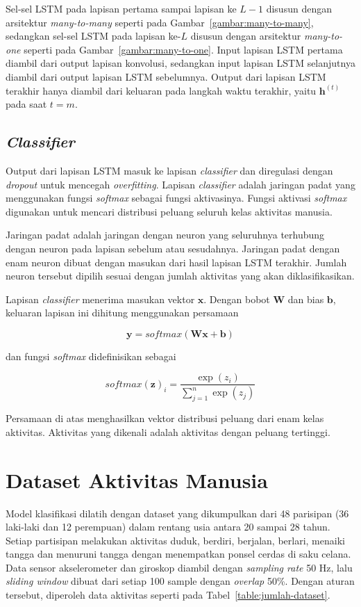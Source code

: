Sel-sel LSTM pada lapisan pertama sampai lapisan ke $L-1$ disusun dengan arsitektur \textit{many-to-many} seperti pada Gambar~\ref{gambar:many-to-many}, sedangkan sel-sel LSTM pada lapisan ke-$L$ disusun dengan arsitektur \textit{many-to-one} seperti pada Gambar~\ref{gambar:many-to-one}. Input lapisan LSTM pertama diambil dari output lapisan konvolusi, sedangkan input lapisan LSTM selanjutnya diambil dari output lapisan LSTM sebelumnya. Output dari lapisan LSTM terakhir hanya diambil dari keluaran pada langkah waktu terakhir, yaitu $\pmb{h}^{(t)}$ pada saat $t = m$.

\subsection{\textit{Classifier}}
Output dari lapisan LSTM masuk ke lapisan \textit{classifier} dan diregulasi dengan \textit{dropout} untuk mencegah \textit{overfitting}. Lapisan \textit{classifier} adalah jaringan padat yang menggunakan fungsi \textit{softmax} sebagai fungsi aktivasinya. Fungsi aktivasi \textit{softmax} digunakan untuk mencari distribusi peluang seluruh kelas aktivitas manusia.

Jaringan padat adalah jaringan dengan neuron yang seluruhnya terhubung dengan neuron pada lapisan sebelum atau sesudahnya. Jaringan padat dengan enam neuron dibuat dengan masukan dari hasil lapisan LSTM terakhir. Jumlah neuron tersebut dipilih sesuai dengan jumlah aktivitas yang akan diklasifikasikan.

Lapisan \textit{classifier} menerima masukan vektor $\pmb{x}$. Dengan bobot $\pmb{W}$ dan bias $\pmb{b}$, keluaran lapisan ini dihitung menggunakan persamaan

\begin{equation}
    \pmb{y} = softmax(\pmb{W} \pmb{x} + \pmb{b})
\end{equation}

\noindent
dan fungsi \textit{softmax} didefinisikan sebagai

\begin{equation}
    softmax(\pmb{z})_i = \frac{\exp(z_i)}{\sum_{j=1}^n \exp(z_j)}
\end{equation}

Persamaan di atas menghasilkan vektor distribusi peluang dari enam kelas aktivitas. Aktivitas yang dikenali adalah aktivitas dengan peluang tertinggi.

\section{Dataset Aktivitas Manusia}
Model klasifikasi dilatih dengan dataset yang dikumpulkan dari 48 parisipan (36 laki-laki dan 12 perempuan) dalam rentang usia antara 20 sampai 28 tahun. Setiap partisipan melakukan aktivitas duduk, berdiri, berjalan, berlari, menaiki tangga dan menuruni tangga dengan menempatkan ponsel cerdas di saku celana. Data sensor akselerometer dan giroskop diambil dengan \textit{sampling rate} 50 Hz, lalu \textit{sliding window} dibuat dari setiap 100 sample dengan \textit{overlap} 50\%. Dengan aturan tersebut, diperoleh data aktivitas seperti pada Tabel~\ref{table:jumlah-dataset}.

